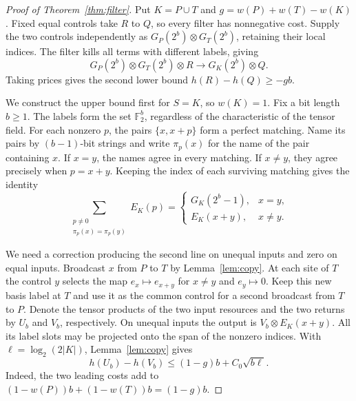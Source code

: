 \begin{proof}[Proof of Theorem~\ref{thm:filter}]
Put \(K=P\cup T\) and \(g=w(P)+w(T)-w(K)\).
Fixed equal controls take \(R\) to \(Q\), so every filter has
nonnegative cost. Supply the two controls independently as
\(G_P(2^b)\otimes G_T(2^b)\), retaining their local indices.
The filter kills all terms with different labels, giving
\[
 G_P(2^b)\otimes G_T(2^b)\otimes R
       \longrightarrow G_K(2^b)\otimes Q .
\]
Taking prices gives the second lower bound \(h(R)-h(Q)\ge -gb\).

We construct the upper bound first for \(S=K\), so \(w(K)=1\).
Fix a bit length \(b\ge1\). The labels form the set \(\mathbb F_2^b\),
regardless of the characteristic of the tensor field. For each
nonzero \(p\), the pairs \(\{x,x+p\}\) form a perfect matching.
Name its pairs by \((b-1)\)-bit strings and write \(\pi_p(x)\)
for the name of the pair containing \(x\). If \(x=y\), the names
agree in every matching. If \(x\ne y\), they agree precisely when
\(p=x+y\). Keeping the index of each surviving matching gives the
identity
\[
 \sum_{\substack{p\ne0\\ \pi_p(x)=\pi_p(y)}} E_K(p)
 =
 \begin{cases}
 G_K(2^b-1), & x=y,\\
 E_K(x+y),   & x\ne y .
 \end{cases}
\]

We need a correction producing the second line on unequal inputs and
zero on equal inputs. Broadcast \(x\) from \(P\) to \(T\) by
Lemma~\ref{lem:copy}. At each site of \(T\) the control \(y\)
selects the map \(e_x\mapsto e_{x+y}\) for \(x\ne y\) and
\(e_y\mapsto0\). Keep this new basis label at \(T\) and use it as
the common control for a second broadcast from \(T\) to \(P\).
Denote the tensor products of the two input resources and the two
returns by \(U_b\) and \(V_b\), respectively. On unequal inputs
the output is \(V_b\otimes E_K(x+y)\). All its label slots may be
projected onto the span of the nonzero indices. With
\(\ell=\log_2(2|K|)\), Lemma~\ref{lem:copy} gives
\begin{equation}\label{eq:filter-correction}
 h(U_b)-h(V_b)\le (1-g)b+C_0\sqrt{b\ell}.
\end{equation}
Indeed, the two leading costs add to
\((1-w(P))b+(1-w(T))b=(1-g)b\).


\end{proof}
